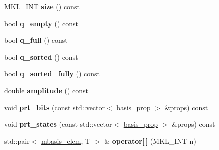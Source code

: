 \begin{DoxyCompactItemize}
\item 
\mbox{\label{classqbasis_1_1wavefunction_a22763386add42741550bf88a9d8c9c89}} 
M\+K\+L\+\_\+\+I\+NT {\bfseries size} () const
\item 
\mbox{\label{classqbasis_1_1wavefunction_ada557c5ac7a1beae6d838d3d71981afb}} 
bool {\bfseries q\+\_\+empty} () const
\item 
\mbox{\label{classqbasis_1_1wavefunction_a82d50d8129a973e70d36bd02ec6c2734}} 
bool {\bfseries q\+\_\+full} () const
\item 
\mbox{\label{classqbasis_1_1wavefunction_a3fa6683238b0ddaf790d804b44320bbb}} 
bool {\bfseries q\+\_\+sorted} () const
\item 
\mbox{\label{classqbasis_1_1wavefunction_a9ea98f830fcc9d4b3ac693e9c41cc3ec}} 
bool {\bfseries q\+\_\+sorted\+\_\+fully} () const
\item 
\mbox{\label{classqbasis_1_1wavefunction_ae6dc8f23e7b1c0362713612cd5f4d98e}} 
double {\bfseries amplitude} () const
\item 
\mbox{\label{classqbasis_1_1wavefunction_a2eef257940208cf2f30d781833d7d9cf}} 
void {\bfseries prt\+\_\+bits} (const std\+::vector$<$ \hyperlink{classqbasis_1_1basis__prop}{basis\+\_\+prop} $>$ \&props) const
\item 
\mbox{\label{classqbasis_1_1wavefunction_aea0e028a20c7301d1e038743e7331d41}} 
void {\bfseries prt\+\_\+states} (const std\+::vector$<$ \hyperlink{classqbasis_1_1basis__prop}{basis\+\_\+prop} $>$ \&props) const
\item 
\mbox{\label{classqbasis_1_1wavefunction_a28bf832ddced91ce58b252f06687dfae}} 
std\+::pair$<$ \hyperlink{classqbasis_1_1mbasis__elem}{mbasis\+\_\+elem}, T $>$ \& {\bfseries operator\mbox{[}$\,$\mbox{]}} (M\+K\+L\+\_\+\+I\+NT n)
\item 
\mbox{\label{classqbasis_1_1wavefunction_af04190aae28ff774051702e3216da4a2}} 

\end{DoxyCompactItemize}
